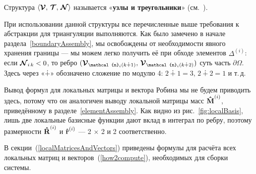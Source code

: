 Структура $\langle \boldsymbol{\mathbf{\mathcal{V}}}, \, \boldsymbol{\mathbf{\mathcal{T}}}, \, \boldsymbol{\mathbf{\mathcal{N}}}\rangle$ называется «\textbf{узлы и треугольники}» (см.~\cite[с.~14]{delaunay}).

При использовании данной структуры все перечисленные выше требования к абстракции для триангуляции выполняются. Как было замечено в начале раздела~\ref{boundaryAssembly}, мы освобождены от необходимости явного хранения границы --- мы можем легко получить её при обходе элементов $\Delta^{(i)}$: если $\boldsymbol{\mathbf{\mathcal{N}}}_{i\,k} < 0$, то ребро $(\vect{\mathcal{V}}_{\vect{\mathcal{n}}_i(k \dotplus 1)}, \, \vect{\mathcal{V}}_{\vect{\mathcal{n}}_i(k \dotplus 2)})$ суть часть $\partial \Omega$. Здесь через «$\dotplus$» обозначено сложение по модулю 4: $2 \dotplus 1 = 3$, $2 \dotplus 2 = 1$ и т.\,д.

Вывод формул для локальных матрицы и вектора Робина мы не будем приводить здесь, потому что он аналогичен выводу локальной матрицы масс $\boldsymbol{\mathbf{\hat{M}}}^{(i)}$, приведённому в разделе~\ref{elementAssembly}. Как видно из рис.~\ref{fig:localBasis}, лишь две локальные базисные функции дают вклад в интеграл по ребру, поэтому размерности $\boldsymbol{\mathbf{\hat{R}}}^{(i)}$ и $\boldsymbol{\mathbf{\hat{r}}}^{(i)}$ --- 2 $\times$ 2 и 2 соответственно.

В секции~(\ref{localMatricesAndVectors}) приведены формулы для расчёта всех локальных матриц и векторов~(\ref{how2compute}), необходимых для сборки системы.

